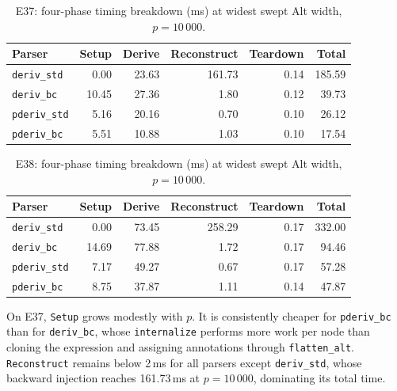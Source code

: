%
%
%

\begin{table}[H]
\centering
\small
\setlength{\tabcolsep}{3pt}
\begin{tabular*}{\textwidth}{@{\extracolsep{\fill}} l rrrrr}
\hline
Parser & Setup & Derive & Reconstruct & Teardown & Total \\
\hline
\texttt{deriv\_std} &  0.00 & 23.63 & 161.73 & 0.14 & 185.59 \\
\texttt{deriv\_bc}        & 10.45 & 27.36 &   1.80 & 0.12 &  39.73 \\
\texttt{pderiv\_std}      &  5.16 & 20.16 &   0.70 & 0.10 &  26.12 \\
\texttt{pderiv\_bc}       &  5.51 & 10.88 &   1.03 & 0.10 &  17.54 \\
\hline
\end{tabular*}
\caption{E37: four-phase timing breakdown (ms) at widest swept
Alt width, $p=10\,000$.}
\label{tab:patho-phases-e37}
\end{table}

%


\begin{table}[H]
\centering
\small
\setlength{\tabcolsep}{3pt}
\begin{tabular*}{\textwidth}{@{\extracolsep{\fill}} l rrrrr}
\hline
Parser & Setup & Derive & Reconstruct & Teardown & Total \\
\hline
\texttt{deriv\_std} &  0.00 & 73.45 & 258.29 & 0.17 & 332.00 \\
\texttt{deriv\_bc}        & 14.69 & 77.88 &   1.72 & 0.17 &  94.46 \\
\texttt{pderiv\_std}      &  7.17 & 49.27 &   0.67 & 0.17 &  57.28 \\
\texttt{pderiv\_bc}       &  8.75 & 37.87 &   1.11 & 0.14 &  47.87 \\
\hline
\end{tabular*}
\caption{E38: four-phase timing breakdown (ms) at widest swept
Alt width, $p=10\,000$.}
\label{tab:patho-phases-e38}
\end{table}

%
%
%


On E37, \texttt{Setup} grows modestly with $p$.
It is consistently cheaper for
\texttt{pderiv\_bc} than for \texttt{deriv\_bc},
whose \texttt{internalize} performs more work
per node than cloning the expression and
assigning annotations through \texttt{flatten\_alt}.
\texttt{Reconstruct} remains below 2\,ms
for all parsers except \texttt{deriv\_std},
whose backward injection reaches 161.73\,ms
at $p=10\,000$, dominating its total time.

